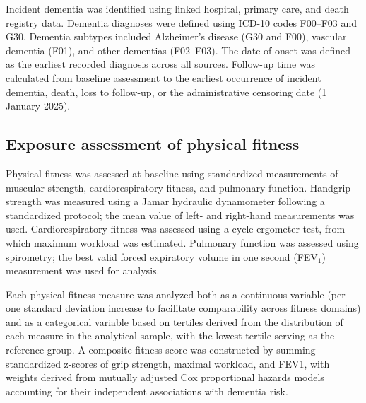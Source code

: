 \documentclass{article}
\begin{document}
Incident dementia was identified using linked hospital, primary care, and death registry data. Dementia diagnoses were defined using ICD-10 codes F00--F03 and G30. Dementia subtypes included Alzheimer's disease (G30 and F00), vascular dementia (F01), and other dementias (F02--F03). The date of onset was defined as the earliest recorded diagnosis across all sources. Follow-up time was calculated from baseline assessment to the earliest occurrence of incident dementia, death, loss to follow-up, or the administrative censoring date (1 January 2025).


\subsection*{Exposure assessment of physical fitness}
\label{sec:exposure_assessment}
Physical fitness was assessed at baseline using standardized measurements of muscular strength, cardiorespiratory fitness, and pulmonary function. Handgrip strength was measured using a Jamar hydraulic dynamometer following a standardized protocol; the mean value of left- and right-hand measurements was used. Cardiorespiratory fitness was assessed using a cycle ergometer test, from which maximum workload was estimated. Pulmonary function was assessed using spirometry; the best valid forced expiratory volume in one second (FEV$_1$) measurement was used for analysis.

Each physical fitness measure was analyzed both as a continuous variable (per one standard deviation increase to facilitate comparability across fitness domains) and as a categorical variable based on tertiles derived from the distribution of each measure in the analytical sample, with the lowest tertile serving as the reference group. A composite fitness score was constructed by summing standardized z-scores of grip strength, maximal workload, and FEV1, with weights derived from mutually adjusted Cox proportional hazards models accounting for their independent associations with dementia risk.
\end{document}
